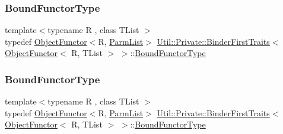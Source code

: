 \subsubsection{\texorpdfstring{BoundFunctorType}{BoundFunctorType}\hspace{0.1cm}{\footnotesize\ttfamily [1/2]}}
{\footnotesize\ttfamily template$<$typename R , class T\+List $>$ \\
typedef \mbox{\hyperlink{classUtil_1_1ObjectFunctor}{Object\+Functor}}$<$R, \mbox{\hyperlink{structUtil_1_1Private_1_1BinderFirstTraits_3_01ObjectFunctor_3_01R_00_01TList_01_4_01_4_a181ef1a7b945beef449f25ba47f49bbc}{Parm\+List}}$>$ \mbox{\hyperlink{structUtil_1_1Private_1_1BinderFirstTraits}{Util\+::\+Private\+::\+Binder\+First\+Traits}}$<$ \mbox{\hyperlink{classUtil_1_1ObjectFunctor}{Object\+Functor}}$<$ R, T\+List $>$ $>$\+::\mbox{\hyperlink{structUtil_1_1Private_1_1BinderFirstTraits_3_01ObjectFunctor_3_01R_00_01TList_01_4_01_4_af907df4f7fd610d891e8b4eabc0a7c39}{Bound\+Functor\+Type}}}

\mbox{\label{structUtil_1_1Private_1_1BinderFirstTraits_3_01ObjectFunctor_3_01R_00_01TList_01_4_01_4_af907df4f7fd610d891e8b4eabc0a7c39}} 
\subsubsection{\texorpdfstring{BoundFunctorType}{BoundFunctorType}\hspace{0.1cm}{\footnotesize\ttfamily [2/2]}}
{\footnotesize\ttfamily template$<$typename R , class T\+List $>$ \\
typedef \mbox{\hyperlink{classUtil_1_1ObjectFunctor}{Object\+Functor}}$<$R, \mbox{\hyperlink{structUtil_1_1Private_1_1BinderFirstTraits_3_01ObjectFunctor_3_01R_00_01TList_01_4_01_4_a181ef1a7b945beef449f25ba47f49bbc}{Parm\+List}}$>$ \mbox{\hyperlink{structUtil_1_1Private_1_1BinderFirstTraits}{Util\+::\+Private\+::\+Binder\+First\+Traits}}$<$ \mbox{\hyperlink{classUtil_1_1ObjectFunctor}{Object\+Functor}}$<$ R, T\+List $>$ $>$\+::\mbox{\hyperlink{structUtil_1_1Private_1_1BinderFirstTraits_3_01ObjectFunctor_3_01R_00_01TList_01_4_01_4_af907df4f7fd610d891e8b4eabc0a7c39}{Bound\+Functor\+Type}}}

